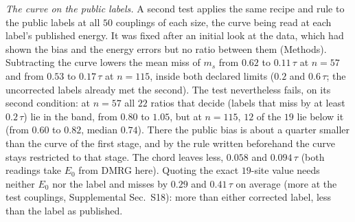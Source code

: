 \documentclass[aps,prx,twocolumn,10pt,superscriptaddress,nofootinbib,longbibliography,floatfix]{revtex4-2}
\theoremstyle{remark}
\newcommand{\ms}{m_s}
\begin{document}
\emph{The curve on the public labels.} A second test applies the same recipe and rule to the public labels at all
$50$ couplings of each size, the curve being read at each label's published energy. It was fixed after an initial %
look at the data, which had shown the bias and the energy errors but no ratio between them (Methods). Subtracting the
curve lowers the mean miss of $\ms$ from $0.62$ to $0.11\,\tau$ at $n=57$ and from $0.53$ to $0.17\,\tau$ at %
$n=115$, inside both declared limits ($0.2$ and $0.6\,\tau$; the uncorrected labels already met the second). %
The test nevertheless fails, on its second condition: at $n=57$ all $22$ %
ratios that decide (labels that miss by at least $0.2\,\tau$) lie in the band, from $0.80$ to $1.05$, but at %
$n=115$, $12$ of the $19$ lie below it (from $0.60$ to $0.82$, median $0.74$). There the public bias is about a %
quarter smaller than the curve of the first stage, and by the rule written beforehand the curve stays restricted to
that stage. The chord leaves less, $0.058$ and $0.094\,\tau$ (both readings take $E_0$ from DMRG here). %
Quoting the exact $19$-site value needs neither $E_0$ nor the label and misses by $0.29$ and $0.41\,\tau$ on %
average (more at the test couplings, Supplemental Sec.~S18): more than either corrected label, less
than the label as published.
\end{document}
